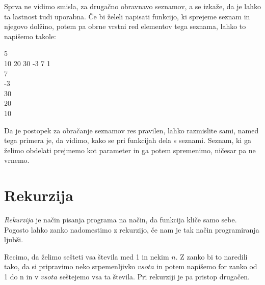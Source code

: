 \begin{examples}
\end{examples}

\newpage

Sprva ne vidimo smisla, za drugačno obravnavo seznamov, a se izkaže, da je
lahko ta lastnost tudi uporabna. Če bi želeli napisati funkcijo, ki sprejeme
seznam in njegovo dolžino, potem pa obrne vrstni red elementov tega seznama,
lahko to napišemo takole:

\begin{examples}


    \begin{inout}
        5 \\
        10 20 30 -3 7 1
         \\ 7 \\ -3 \\ 30 \\ 20 \\ 10 \\
    \end{inout}

\end{examples}

Da je postopek za obračanje seznamov res pravilen, lahko razmislite sami, named
tega primera je, da vidimo, kako se pri funkcijah dela s seznami. Seznam, ki ga
želimo obdelati prejmemo kot parameter in ga potem spremenimo, ničesar pa ne
vrnemo.


\section{Rekurzija}

\emph{Rekurzija} je način pisanja programa na način, da funkcija kliče samo
sebe. Pogosto lahko zanko nadomestimo z rekurzijo, če nam je tak način
programiranja ljubši.

Recimo, da želimo sešteti vsa števila med 1 in nekim $n$. Z zanko bi to
naredili tako, da si pripravimo neko srpemenljivko $vsota$ in potem napišemo
for zanko od 1 do n in v $vsota$ seštejemo vsa ta števila. Pri rekurziji je pa
pristop drugačen.

\begin{examples}
\end{examples}

